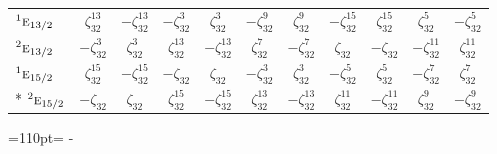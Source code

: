 \documentclass[10pt,a4paper]{article}
\newcommand{\needspace}[1]{\par\penalty-100\begingroup\dimen0=#1\relax\dimen2=\pagegoal
  \advance\dimen2-\pagetotal\ifdim\dimen0>\dimen2\relax\ifdim\dimen2>0pt\vfil\break\fi\fi
  \endgroup}
\numberwithin{equation}{section}
\newcommand{\irr}[1]{\text{\normalfont\scshape #1}}
\newcommand{\conjpair}[1]{{}^{#1}}
\newcommand{\rootunity}[1]{\zeta_{#1}}
\begin{document}
{\begin{longtable}{@{}lcccccccccc@{}}
$\conjpair{1}\irr{e}_{13/2}$ & $\rootunity{32}^{13}$ & $-\rootunity{32}^{13}$ & $-\rootunity{32}^{3}$ & $\rootunity{32}^{3}$ & $-\rootunity{32}^{9}$ & $\rootunity{32}^{9}$ & $-\rootunity{32}^{15}$ & $\rootunity{32}^{15}$ & $\rootunity{32}^{5}$ & $-\rootunity{32}^{5}$\\
$\conjpair{2}\irr{e}_{13/2}$ & $-\rootunity{32}^{3}$ & $\rootunity{32}^{3}$ & $\rootunity{32}^{13}$ & $-\rootunity{32}^{13}$ & $\rootunity{32}^{7}$ & $-\rootunity{32}^{7}$ & $\rootunity{32}$ & $-\rootunity{32}$ & $-\rootunity{32}^{11}$ & $\rootunity{32}^{11}$\\
$\conjpair{1}\irr{e}_{15/2}$ & $\rootunity{32}^{15}$ & $-\rootunity{32}^{15}$ & $-\rootunity{32}$ & $\rootunity{32}$ & $-\rootunity{32}^{3}$ & $\rootunity{32}^{3}$ & $-\rootunity{32}^{5}$ & $\rootunity{32}^{5}$ & $-\rootunity{32}^{7}$ & $\rootunity{32}^{7}$\\*
$\conjpair{2}\irr{e}_{15/2}$ & $-\rootunity{32}$ & $\rootunity{32}$ & $\rootunity{32}^{15}$ & $-\rootunity{32}^{15}$ & $\rootunity{32}^{13}$ & $-\rootunity{32}^{13}$ & $\rootunity{32}^{11}$ & $-\rootunity{32}^{11}$ & $\rootunity{32}^{9}$ & $-\rootunity{32}^{9}$\\
\bottomrule\end{longtable}}
\needspace{110pt}
\end{document}
